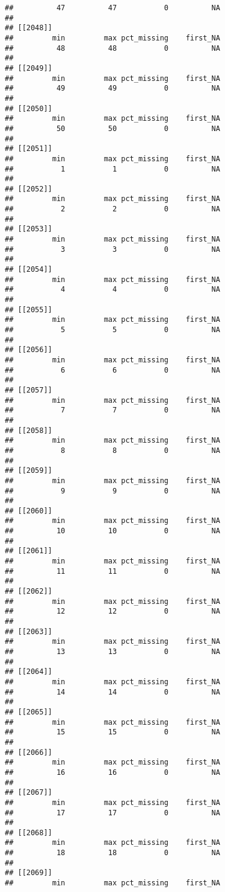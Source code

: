 \documentclass[
]{article}
\begin{document}
\begin{verbatim}
##          47          47           0          NA 
## 
## [[2048]]
##         min         max pct_missing    first_NA 
##          48          48           0          NA 
## 
## [[2049]]
##         min         max pct_missing    first_NA 
##          49          49           0          NA 
## 
## [[2050]]
##         min         max pct_missing    first_NA 
##          50          50           0          NA 
## 
## [[2051]]
##         min         max pct_missing    first_NA 
##           1           1           0          NA 
## 
## [[2052]]
##         min         max pct_missing    first_NA 
##           2           2           0          NA 
## 
## [[2053]]
##         min         max pct_missing    first_NA 
##           3           3           0          NA 
## 
## [[2054]]
##         min         max pct_missing    first_NA 
##           4           4           0          NA 
## 
## [[2055]]
##         min         max pct_missing    first_NA 
##           5           5           0          NA 
## 
## [[2056]]
##         min         max pct_missing    first_NA 
##           6           6           0          NA 
## 
## [[2057]]
##         min         max pct_missing    first_NA 
##           7           7           0          NA 
## 
## [[2058]]
##         min         max pct_missing    first_NA 
##           8           8           0          NA 
## 
## [[2059]]
##         min         max pct_missing    first_NA 
##           9           9           0          NA 
## 
## [[2060]]
##         min         max pct_missing    first_NA 
##          10          10           0          NA 
## 
## [[2061]]
##         min         max pct_missing    first_NA 
##          11          11           0          NA 
## 
## [[2062]]
##         min         max pct_missing    first_NA 
##          12          12           0          NA 
## 
## [[2063]]
##         min         max pct_missing    first_NA 
##          13          13           0          NA 
## 
## [[2064]]
##         min         max pct_missing    first_NA 
##          14          14           0          NA 
## 
## [[2065]]
##         min         max pct_missing    first_NA 
##          15          15           0          NA 
## 
## [[2066]]
##         min         max pct_missing    first_NA 
##          16          16           0          NA 
## 
## [[2067]]
##         min         max pct_missing    first_NA 
##          17          17           0          NA 
## 
## [[2068]]
##         min         max pct_missing    first_NA 
##          18          18           0          NA 
## 
## [[2069]]
##         min         max pct_missing    first_NA 

\end{verbatim}
\end{document}
